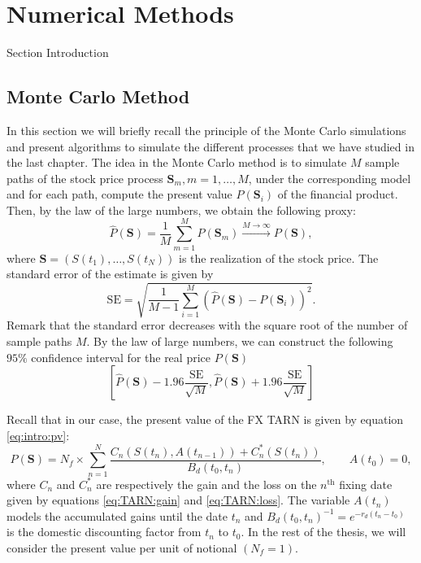 \chapter{Numerical Methods}
\label{sec:methods}


Section Introduction

\section{Monte Carlo Method }
\label{sec:methods:MC}
In this section we will briefly recall the principle of the Monte Carlo simulations and present algorithms to simulate the different processes that we have studied in the last chapter. The idea in the Monte Carlo method is to simulate $M$ sample paths of the stock price process $\mathbf{S}_m, m=1,\ldots,M$, under the corresponding model and for each path, compute the present value $P(\mathbf{S}_i)$ of the financial product. Then, by the law of the large numbers, we obtain the following proxy:
$$\hat{P}(\mathbf{S})=\frac{1}{M}\sum_{m=1}^M P(\mathbf{S}_m)\xrightarrow{M\to\infty} P(\mathbf{S}),$$
where $\mathbf{S}=(S(t_1),\ldots,S(t_N))$ is the realization of the stock price. The standard error of the estimate is given by
$$\text{SE} = \sqrt{\frac{1}{M-1}\sum_{i=1}^M \left(\hat{P}(\mathbf{S})-P(\mathbf{S}_i)\right)^2}.$$
Remark that the standard error decreases with the square root of the number of sample paths $M$. By the law of large numbers, we can construct the following $95\%$ confidence interval for the real price $P(\mathbf{S})$
$$\left[\hat{P}(\mathbf{S})-1.96\frac{\text{SE}}{\sqrt{M}},\hat{P}(\mathbf{S})+1.96\frac{\text{SE}}{\sqrt{M}} \right]$$

Recall that in our case, the present value of the FX TARN is given by equation \eqref{eq:intro:pv}:
$$P(\mathbf{S}) =N_f \times \sum_{n=1}^N\frac{C_n(S(t_n),A(t_{n-1}))+C^\ast_n(S(t_n))}{B_d(t_0,t_n)}, \qquad A(t_0)=0,$$
where $C_n$ and $C_n^\ast$ are respectively the gain and the loss on the $n^\text{th}$ fixing date given by equations \eqref{eq:TARN:gain} and \eqref{eq:TARN:loss}. The variable $A(t_n)$ models the accumulated gains until the date $t_n$ and $B_d(t_0,t_n)^{-1}=e^{-r_d(t_n-t_0)}$ is the domestic discounting factor from $t_n$ to $t_0$. In the rest of the thesis, we will consider the present value per unit of notional $(N_f=1)$.

